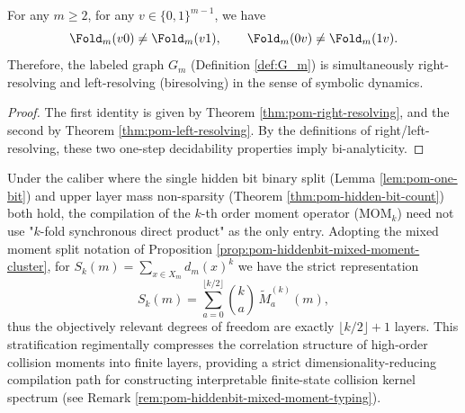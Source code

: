 \begin{conclusion}\label{con:pom-fold-biresolving}
For any \(m\ge 2\), for any \(v\in\{0,1\}^{m-1}\), we have
\[
\Fold_m(v0)\ne \Fold_m(v1),\qquad
\Fold_m(0v)\ne \Fold_m(1v).
\]
Therefore, the labeled graph \(G_m\) (Definition \ref{def:G_m}) is simultaneously right-resolving and left-resolving (biresolving) in the sense of symbolic dynamics.
\end{conclusion}
\begin{proof}
The first identity is given by Theorem \ref{thm:pom-right-resolving}, and the second by Theorem \ref{thm:pom-left-resolving}.
By the definitions of right/left-resolving, these two one-step decidability properties imply bi-analyticity.
\end{proof}

\begin{conclusion}\label{con:pom-hidden-bit-moment-compilation-dim-reduction}
Under the caliber where the single hidden bit binary split (Lemma \ref{lem:pom-one-bit}) and upper layer mass non-sparsity (Theorem \ref{thm:pom-hidden-bit-count}) both hold,
the compilation of the \(k\)-th order moment operator (\(\mathrm{MOM}_k\)) need not use "\(k\)-fold synchronous direct product" as the only entry.
Adopting the mixed moment split notation of Proposition \ref{prop:pom-hiddenbit-mixed-moment-cluster},
for
\(
S_k(m)=\sum_{x\in X_m}d_m(x)^k
\)
we have the strict representation
\[
S_k(m)=\sum_{a=0}^{\lfloor k/2\rfloor}\binom{k}{a}\,\widetilde M_a^{(k)}(m),
\]
thus the objectively relevant degrees of freedom are exactly \(\lfloor k/2\rfloor+1\) layers.
This stratification regimentally compresses the correlation structure of high-order collision moments into finite layers, providing a strict dimensionality-reducing compilation path for constructing interpretable finite-state collision kernel spectrum (see Remark \ref{rem:pom-hiddenbit-mixed-moment-typing}).
\end{conclusion}

